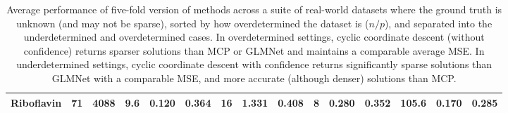 \documentclass[mnsc,nonblindrev]{informs3} %
\begin{document}
\begin{table}[h]
\begin{tabular}{@{}l r r r r r r r r r r r r r r@{}}
Riboflavin & 71 & 4088 & 9.6 & 	0.120 & 	0.364 & 	16 & 	1.331 & 	0.408 & 	8 & 	0.280 & 	0.352 & 	105.6 & 	0.170 & 	0.285 \\ 
\bottomrule
\end{tabular}
\caption{Average performance of five-fold version of methods across a suite of real-world datasets where the ground truth is unknown (and may not be sparse), sorted by how overdetermined the dataset is ($n/p$), and separated into the underdetermined and overdetermined cases. In overdetermined settings, cyclic coordinate descent (without confidence) returns sparser solutions than MCP or GLMNet and maintains a comparable average MSE. In underdetermined settings, cyclic coordinate descent with confidence returns significantly sparse solutions than GLMNet with a comparable MSE, and more accurate (although denser) solutions than MCP.
}
\label{tab:comparison_ourmethods5}
\end{table}
\end{document}
